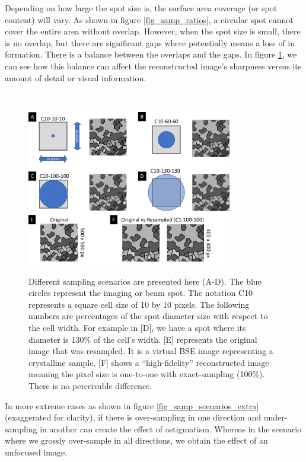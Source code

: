 \documentclass[12pt]{article}
\begin{document}
Depending on how large the spot size is, the surface area coverage (or spot content) will vary. As shown in
figure \ref{fig_samp_ratios}, a circular spot cannot cover the entire area without overlap. However,
when the spot size is small, there is no overlap, but there are significant gaps where potentially 
means a loss of in formation. There is a balance between the overlaps and the gaps. 
In figure \ref{fig_samp_scenarios}, we can see how this balance can affect the reconstructed image's
sharpness versus its amount of detail or visual information.

~\newline

\begin{figure}[h!]
\begin{center}
{
 \includegraphics[width=0.8\textwidth]{figures/spot_ratio/sampling_scenarios.pdf}
}
\caption{\label{fig_samp_scenarios} Different sampling scenarios are presented here (A-D). The blue circles represent the imaging or beam spot. The notation C10 represents a square cell size of 10 by 10 pixels. The following numbers are percentages of the spot diameter size with respect to the cell width. For example in [D], we have a spot where its diameter is 130\% of the cell's width. [E] represents the original image that was resampled. It is a virtual BSE image representing a crystalline sample. [F] shows a ``high-fidelity'' reconstructed image meaning the pixel size is one-to-one with exact-sampling (100\%). There is no perceivable difference.}
\end{center}
\end{figure}

\newpage

In more extreme cases as shown in figure \ref{fig_samp_scenarios_extra} (exaggerated for clarity), 
if there is over-sampling in one direction and under-sampling in another can create the effect of 
astigmatism. Whereas in the scenario where we grossly over-sample in all directions, we obtain the 
effect of an unfocused image.
\end{document}

